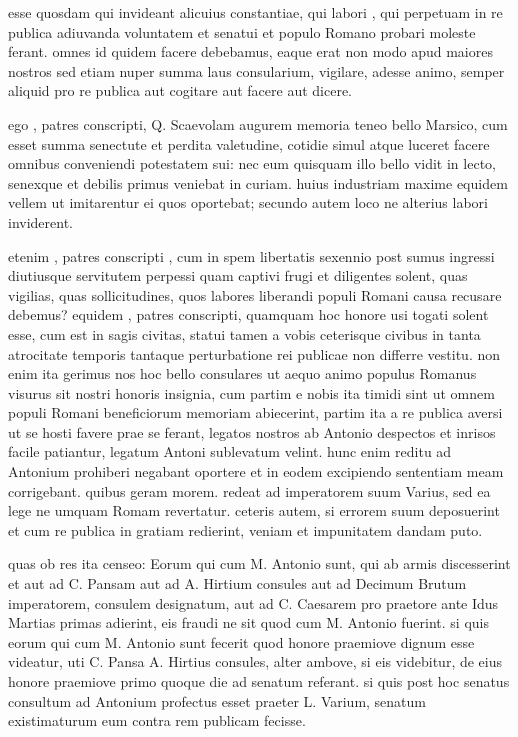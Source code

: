  esse quosdam qui invideant alicuius constantiae, qui labori , qui perpetuam in re publica adiuvanda voluntatem et senatui et populo Romano probari moleste ferant. omnes id quidem facere debebamus, eaque erat non modo apud maiores nostros sed etiam nuper summa laus consularium, vigilare, adesse animo, semper aliquid pro re publica aut cogitare aut facere aut dicere.

 ego , patres conscripti, Q. Scaevolam augurem memoria teneo bello Marsico, cum esset summa senectute et perdita valetudine, cotidie simul atque luceret facere omnibus conveniendi potestatem sui: nec eum quisquam illo bello vidit in lecto, senexque et debilis primus veniebat in curiam. huius industriam maxime equidem vellem ut imitarentur ei quos oportebat; secundo autem loco ne alterius labori inviderent.

 etenim , patres conscripti , cum in spem libertatis sexennio post sumus ingressi diutiusque servitutem perpessi quam captivi frugi et diligentes solent, quas vigilias, quas sollicitudines, quos labores liberandi populi Romani causa recusare debemus? equidem , patres conscripti, quamquam hoc honore usi togati solent esse, cum est in sagis civitas, statui tamen a vobis ceterisque civibus in tanta atrocitate temporis tantaque perturbatione rei publicae non differre vestitu. non enim ita gerimus nos hoc bello consulares ut aequo animo populus Romanus visurus sit nostri honoris insignia, cum partim e nobis ita timidi sint ut omnem populi Romani beneficiorum memoriam abiecerint, partim ita a re publica aversi ut se hosti favere prae se ferant, legatos nostros ab Antonio despectos et inrisos facile patiantur, legatum Antoni sublevatum velint. hunc enim reditu ad Antonium prohiberi negabant oportere et in eodem excipiendo sententiam meam corrigebant. quibus geram morem. redeat ad imperatorem suum Varius, sed ea lege ne umquam Romam revertatur. ceteris autem, si errorem suum deposuerint et cum re publica in gratiam redierint, veniam et impunitatem dandam puto.

 quas ob res ita censeo: Eorum qui cum M. Antonio sunt, qui ab armis discesserint et aut ad C. Pansam aut ad A. Hirtium consules aut ad Decimum Brutum imperatorem, consulem designatum, aut ad C. Caesarem pro praetore ante Idus Martias primas adierint, eis fraudi ne sit quod cum M. Antonio fuerint. si quis eorum qui cum M. Antonio sunt fecerit quod honore praemiove dignum esse videatur, uti C. Pansa A. Hirtius consules, alter ambove, si eis videbitur, de eius honore praemiove primo quoque die ad senatum referant. si quis post hoc senatus consultum ad Antonium profectus esset praeter L. Varium, senatum existimaturum eum contra rem publicam fecisse.
